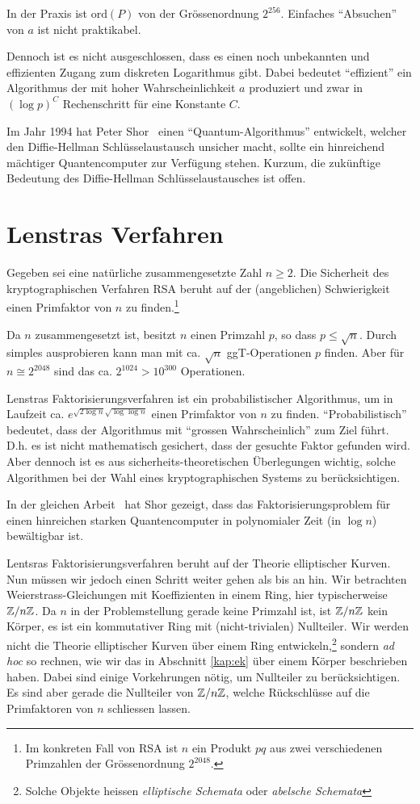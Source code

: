 In der Praxis ist $\mathrm{ord}(P)$
von der Grössenordnung $2^{256}$. Einfaches ``Absuchen'' von $a$ ist
nicht praktikabel.

Dennoch ist es nicht ausgeschlossen, dass es einen noch unbekannten
und effizienten Zugang zum diskreten Logarithmus gibt. Dabei bedeutet
``effizient'' ein Algorithmus der mit hoher Wahrscheinlichkeit $a$
produziert und zwar in $(\log p)^C$ Rechenschritt für eine Konstante
$C$.

Im Jahr 1994 hat Peter Shor~\cite{shor} einen ``Quantum-Algorithmus'' entwickelt,
welcher den Diffie-Hellman Schlüsselaustausch unsicher macht, sollte
ein hinreichend mächtiger Quantencomputer zur Verfügung stehen.
Kurzum, die zukünftige Bedeutung des Diffie-Hellman
Schlüsselaustausches ist offen.

\section{Lenstras Verfahren}

Gegeben sei eine natürliche zusammengesetzte Zahl $n\ge 2$.
Die Sicherheit des kryptographischen Verfahren RSA beruht auf der (angeblichen)
Schwierigkeit einen Primfaktor von $n$ zu finden.\footnote{Im
  konkreten Fall von RSA ist $n$ ein Produkt $pq$ aus zwei
  verschiedenen Primzahlen
  der Grössenordnung $2^{2048}$.}


Da $n$ zusammengesetzt ist, besitzt $n$ einen Primzahl $p$, so dass
$p\le \sqrt{n}$. Durch simples ausprobieren kann man mit ca. $\sqrt n$
ggT-Operationen $p$ finden. Aber für $n\cong 2^{2048}$ sind das ca.
$2^{1024}> 10^{300}$ Operationen. 

Lenstras Faktorisierungsverfahren ist ein probabilistischer
Algorithmus, um in Laufzeit ca. $e^{\sqrt{2\log n}\sqrt{\log\log n}}$
einen Primfaktor von $n$ zu finden. ``Probabilistisch'' bedeutet, dass
der Algorithmus mit ``grossen Wahrscheinlich'' zum Ziel führt. D.h. es
ist nicht mathematisch gesichert, dass der gesuchte Faktor gefunden
wird. Aber dennoch ist es aus sicherheits-theoretischen Überlegungen
wichtig, solche Algorithmen bei der Wahl eines kryptographischen
Systems zu berücksichtigen.

In der gleichen Arbeit~\cite{shor} hat Shor gezeigt, dass das
Faktorisierungsproblem für einen hinreichen starken Quantencomputer
in polynomialer Zeit (in $\log n$) bewältigbar ist.

Lentsras Faktorisierungsverfahren beruht auf der Theorie
elliptischer Kurven. Nun müssen wir jedoch einen Schritt weiter gehen
als bis an hin. Wir betrachten Weierstrass-Gleichungen mit
Koeffizienten in einem Ring, hier typischerweise ${\mathbb{Z}}/n{\mathbb{Z}}$. Da
$n$ in der Problemstellung gerade keine Primzahl ist, ist ${\mathbb{Z}}/n{\mathbb{Z}}$
kein Körper, es ist ein kommutativer Ring mit (nicht-trivialen)
Nullteiler. Wir werden nicht die Theorie elliptischer Kurven über
einem Ring entwickeln,\footnote{Solche Objekte heissen
  \emph{elliptische Schemata} oder \emph{abelsche Schemata}}
sondern  \textit{ad hoc} so rechnen, wie wir das in Abschnitt
\ref{kap:ek} über einem Körper beschrieben haben. Dabei sind einige
Vorkehrungen nötig, um Nullteiler zu berücksichtigen. Es sind aber
gerade die Nullteiler von ${\mathbb{Z}}/n{\mathbb{Z}}$, welche Rückschlüsse auf die
Primfaktoren von $n$ schliessen lassen.

